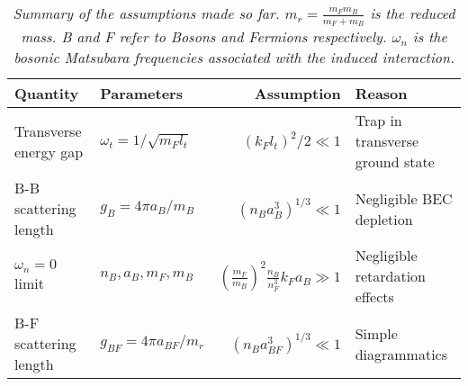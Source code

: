 \begin{table}[htb]
\centering
\caption{\textit{Summary of the assumptions made so far. $m_r = \frac{m_Fm_B}{m_F+m_B}$ is the reduced mass. B and F refer to Bosons and Fermions respectively. $\omega_n$ is the bosonic Matsubara frequencies associated with the induced interaction.}}
\begin{tabular}{|l|l|r|l|}
\hline \textbf{Quantity} & \textbf{Parameters} 				& \textbf{Assumption}						& \textbf{Reason}	\\
\hline Transverse energy gap & $\omega_t = 1/\sqrt{m_Fl_t}$ & $(k_Fl_t)^2/2 	\ll 1$ 					& Trap in transverse ground state \\
\hline B-B scattering length & $g_B = 4\pi a_B/m_B$			& $(n_Ba_B^3)^{1/3}	\ll 1$					& Negligible BEC depletion  \\
\hline $\omega_n = 0$ limit  & $n_B, a_B, m_F, m_B$			& $(\frac{m_F}{m_B})^2 \frac{n_B}{n_F^3}k_Fa_B \gg 1$ & Negligible retardation effects  \\
\hline B-F scattering length & $g_{BF} = 4\pi a_{BF}/m_r$ 	& $(n_Ba_{BF}^3)^{1/3}	\ll 1$				& Simple diagrammatics\\
\hline 
\end{tabular}
\label{tab.assumptions}
\end{table}

